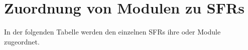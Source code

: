 \chapter{Zuordnung von Modulen zu SFRs}\label{appendix.sfr2module}

In der folgenden Tabelle werden den einzelnen SFRs ihre 
oder  Module zugeordnet.

\generateSfrToModulesTable{}

